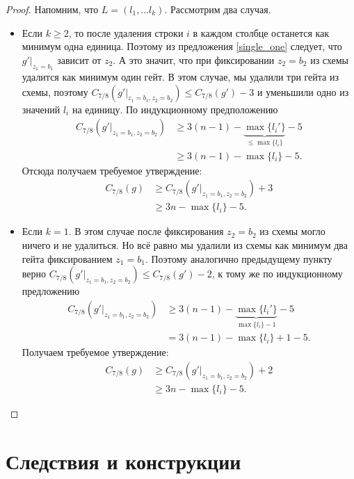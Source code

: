 \documentclass[oneside, a4paper]{article}
\theoremstyle{plain}
\theoremstyle{remark}
\begin{document}
\begin{proof}
Напомним, что $L = (l_1, \dots l_k)$. Рассмотрим два случая.
\begin{itemize}
\item Если $k \geq 2$, то после удаления строки $i$ в каждом столбце останется
как минимум одна единица. Поэтому из предложения \ref{single_one} следует, что
$g' \rvert _ {z_1 = b_1}$ зависит от $z_2$. А это значит, что при фиксировании
$z_2 = b_2$ из схемы удалится как минимум один гейт. В этом случае, мы удалили
три гейта из схемы, поэтому $C_{7/8}(g' \rvert _ {z_1 = b_1, z_2 = b_2}) \leq C_{7/8}(g') - 3$
и уменьшили одно из значений $l_i$ на единицу. По индукционному предположению
\[
\begin{aligned}
C_{7/8}(g' \rvert _ {z_1 = b_1, z_2 = b_2}) &\geq 3(n - 1) - \underbrace{\max \{l_i'\}}_{\leq \max \{l_i\}} - 5 \\
&\geq 3(n - 1) - \max \{l_i\} - 5.
\end{aligned}
\]
Отсюда получаем требуемое утверждение:
\[
\begin{aligned}
C_{7/8}(g) &\geq C_{7/8}(g' \rvert _ {z_1 = b_1, z_2 = b_2}) + 3 \\
           &\geq 3n - \max \{l_i\} - 5.
\end{aligned}
\]

\item Если $k = 1$. В этом случае после фиксирования $z_2 = b_2$ из схемы могло
ничего и не удалиться. Но всё равно мы удалили из схемы как минимум два гейта
фиксированием $z_1 = b_1$. Поэтому аналогично предыдущему пункту верно $C_{7/8}(g'
\rvert _ {z_1 = b_1, z_2 = b_2}) \leq C_{7/8}(g') - 2$, к тому же по индукционному
предложению
\[
\begin{aligned}
C_{7/8}(g' \rvert _ {z_1 = b_1, z_2 = b_2}) &\geq 3(n - 1) - \underbrace{\max \{l_i'\}}_{\max \{l_i\} - 1} - 5 \\
&= 3(n - 1) - \max \{l_i\} + 1 - 5.
\end{aligned}
\]
Получаем требуемое утверждение:
\[
\begin{aligned}
C_{7/8}(g) &\geq C_{7/8}(g' \rvert _ {z_1 = b_1, z_2 = b_2}) + 2 \\
           &\geq 3n - \max \{l_i\} - 5.
\end{aligned}
\]
\end{itemize}
\end{proof}

\section{Следствия и конструкции}
\label{sec_corr}
\end{document}
